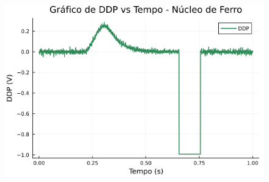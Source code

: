 \begin{center}
\begin{multicols}{2}
\begin{figure}[H]
    \centering
    \includegraphics[width=1.0\linewidth]{figuras/grafico_dados3_F0012CH1.png}
\end{figure}

\end{multicols}
\end{center}


